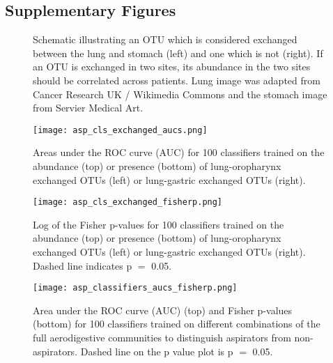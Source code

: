 \documentclass{article}
\begin{document}
\subsection{Supplementary Figures}

\begin{figure}[h]
        \begin{center}
        \caption{Schematic illustrating an OTU which is considered exchanged between the lung and stomach (left) and one which is not (right). If an OTU is exchanged in two sites, its abundance in the two sites should be correlated across patients. Lung image was adapted from Cancer Research UK / Wikimedia Commons and the stomach image from Servier Medical Art.}
        \label{fig:exchanged_schematic}
        \end{center}
\end{figure}


\begin{figure}[h]
        \begin{center}\texttt{[image: asp\_cls\_exchanged\_aucs.png]}
        \caption{Areas under the ROC curve (AUC) for 100 classifiers trained on the abundance (top) or presence (bottom) of lung-oropharynx exchanged OTUs (left) or lung-gastric exchanged OTUs (right).}
        \label{fig:exchanged_cls_aucs}
        \end{center}
\end{figure}

\begin{figure}[h]
        \begin{center}\texttt{[image: asp\_cls\_exchanged\_fisherp.png]}
        \caption{Log of the Fisher p-values for 100 classifiers trained on the abundance (top) or presence (bottom) of lung-oropharynx exchanged OTUs (left) or lung-gastric exchanged OTUs (right). Dashed line indicates p $=$ 0.05.}
        \label{fig:exchanged_cls_p}
        \end{center}
\end{figure}

\begin{figure}[h]
        \begin{center}\texttt{[image: asp\_classifiers\_aucs\_fisherp.png]}
        \caption{Area under the ROC curve (AUC) (top) and Fisher p-values (bottom) for 100 classifiers trained on different combinations of the full aerodigestive communities to distinguish aspirators from non-aspirators. Dashed line on the p value plot is p $=$ 0.05.}
        \label{fig:aucs_pvalues}
        \end{center}
\end{figure}

\FloatBarrier
\newpage
\end{document}
